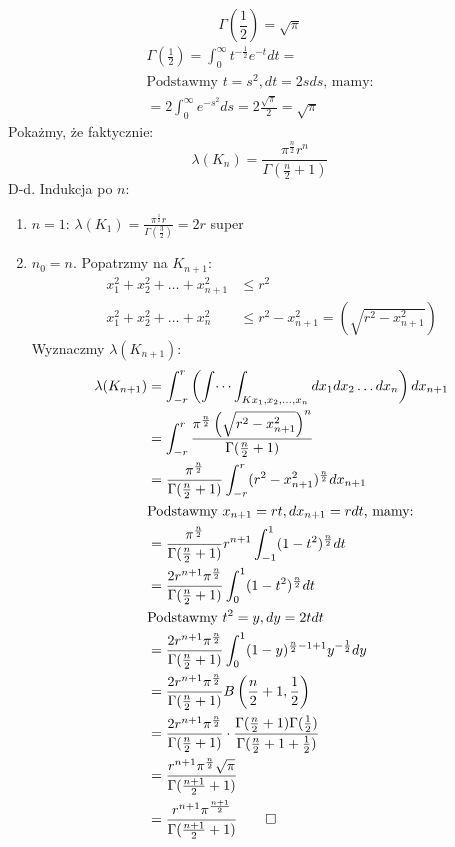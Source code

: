 \documentclass{article}
\theoremstyle{definition}
\theoremstyle{definition}
\theoremstyle{definition}
\theoremstyle{definition}
\begin{document}
\[\Gamma\left(\frac{1}{2}\right) = \sqrt{\pi}\]
\begin{align}
    \Gamma\left(\frac{1}{2}\right) = \int_{0}^{\infty} t^{-\frac{1}{2}} e^{-t} dt=\\
    \text{Podstawmy } t=s^2, dt=2sds \text{, mamy:}\\
    =2\int_{0}^{\infty} e^{-s^2} ds = 2 \frac{\sqrt{\pi}}{2} = \sqrt{\pi}
\end{align}
Pokażmy, że faktycznie:
\[\lambda(K_n) = \frac{\pi^{\frac{n}{2}}r^n}{\Gamma(\frac{n}{2}+1)}\]
D-d. Indukcja po $n$:
\begin{enumerate}
    \item $n=1$:
    $\lambda(K_1)=\frac{\pi^{\frac{1}{2}}r}{\Gamma\left(\frac{3}{2}\right)}=2r$ super
    \item $n_0=n$. Popatrzmy na $K_{n+1}$:
    \begin{align}
        x_1^2+x_2^2+\dots+x_{n+1}^2 &\leq r^2\\
        x_1^2+x_2^2+\dots+x_n^2 &\leq r^2-x_{n+1}^2 = \left(\sqrt{r^2-x_{n+1}^2}\right)
    \end{align}
    Wyznaczmy $\lambda(K_{n+1})$: 
    \begin{align}
        \lambda(K_{n+1}) &= \int_{-r}^{r} \left(\int \dots \int_{K x_1,x_2,\dots,x_n} dx_1 dx_2 \dots dx_n\right) dx_{n+1}\\
        &=\int_{-r}^{r} \frac{\pi^{\frac{n}{2}} \left(\sqrt{r^2-x_{n+1}^2}\right)^n}{\Gamma(\frac{n}{2}+1)}\\
        &=\frac{\pi^{\frac{n}{2}}}{\Gamma(\frac{n}{2}+1)} \int_{-r}^{r} (r^2-x_{n+1}^2)^{\frac{n}{2}} dx_{n+1}\\
        &\text {Podstawmy } x_{n+1}=rt, dx_{n+1} = rdt \text{, mamy:}\\
        &=\frac{\pi^{\frac{n}{2}}}{\Gamma(\frac{n}{2}+1)}r^{n+1} \int_{-1}^{1} (1-t^2)^{\frac{n}{2}} dt\\
        &=\frac{2r^{n+1}\pi^{\frac{n}{2}}}{\Gamma(\frac{n}{2}+1)} \int_{0}^{1} (1-t^2)^{\frac{n}{2}} dt\\
        &\text {Podstawmy } t^2=y, dy=2t dt\\
        &=\frac{2r^{n+1}\pi^{\frac{n}{2}}}{\Gamma(\frac{n}{2}+1)} \int_{0}^{1} (1-y)^{\frac{n}{2}-1+1} y^{-\frac{1}{2}} dy\\ 
        &=\frac{2r^{n+1}\pi^{\frac{n}{2}}}{\Gamma(\frac{n}{2}+1)} B\left(\frac{n}{2}+1,\frac{1}{2}\right)\\
        &=\frac{2r^{n+1}\pi^{\frac{n}{2}}}{\Gamma(\frac{n}{2}+1)} \cdot \frac{\Gamma(\frac{n}{2}+1)\Gamma(\frac{1}{2})}{\Gamma(\frac{n}{2} + 1 + \frac{1}{2})}\\
        &=\frac{r^{n+1} \pi^{\frac{n}{2}} \sqrt{\pi}}{\Gamma(\frac{n+1}{2}+1)}\\
        &=\frac{r^{n+1} \pi^{\frac{n+1}{2}}}{\Gamma(\frac{n+1}{2}+1)}\qed
    \end{align}
\end{enumerate}
\end{document}
